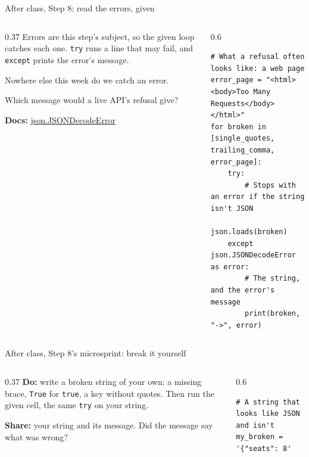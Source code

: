 \documentclass[9pt,aspectratio=169]{beamer}
\begin{document}
\begin{frame}[fragile]{After class, Step 8: read the errors, given}
    \begin{columns}[T]
        \begin{column}{0.37\textwidth}
            Errors are this step's subject, so the given loop catches each one. \texttt{try} runs a line that may fail, and \texttt{except} prints the error's message.

            \medskip
            Nowhere else this week do we catch an error.

            \medskip
            Which message would a live API's refusal give?

            \medskip
            {\scriptsize\textbf{Docs:} \href{https://docs.python.org/3/library/json.html\#json.JSONDecodeError}{json.JSONDecodeError}\par}
        \end{column}
        \begin{column}{0.6\textwidth}
\begin{lstlisting}
# What a refusal often looks like: a web page
error_page = "<html><body>Too Many Requests</body></html>"
for broken in [single_quotes, trailing_comma, error_page]:
    try:
        # Stops with an error if the string isn't JSON
        json.loads(broken)
    except json.JSONDecodeError as error:
        # The string, and the error's message
        print(broken, "->", error)
\end{lstlisting}
        \end{column}
    \end{columns}
\end{frame}

\begin{frame}[fragile]{After class, Step 8's microsprint: break it yourself}
    \begin{columns}[T]
        \begin{column}{0.37\textwidth}
            \textbf{Do:} write a broken string of your own: a missing brace, \texttt{True} for \texttt{true}, a key without quotes. Then run the given cell, the same \texttt{try} on your string.

            \medskip
            \textbf{Share:} your string and its message. Did the message say what was wrong?
        \end{column}
        \begin{column}{0.6\textwidth}
\begin{lstlisting}
# A string that looks like JSON and isn't
my_broken = '{"seats": 8'
\end{lstlisting}
        \end{column}
    \end{columns}
\end{frame}
\end{document}
